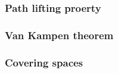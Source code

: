 \documentclass{../note}
\begin{document}
\section{Path lifting proerty}

\section{Van Kampen theorem}

\section{Covering spaces}

\part{}

\part{}
\end{document}
